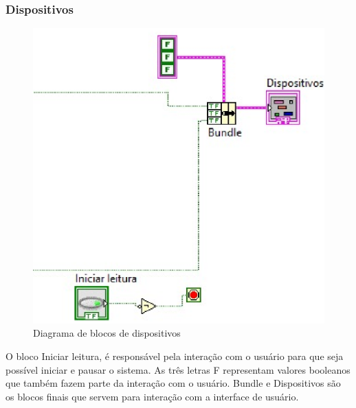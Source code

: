\subsubsection{Dispositivos}

\begin{figure}[!htb]                                                               
    \centering                                                                      
    \includegraphics[scale=0.6, keepaspectratio=true]{figuras/detalhado/_bundle.eps} 
    \caption{Diagrama de blocos de dispositivos}
 \end{figure}

O bloco Iniciar leitura, é responsável pela interação com o usuário para que seja possível iniciar e pausar o sistema. As três letras F representam valores booleanos que também fazem parte da interação com o usuário.
    Bundle e Dispositivos são os blocos finais que servem para interação com a interface de usuário.

\newpage
